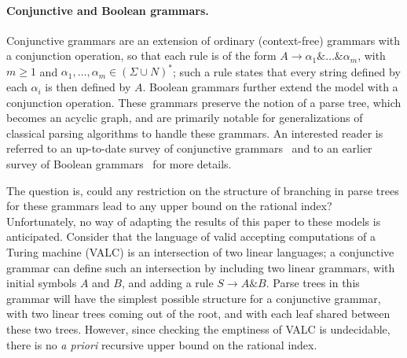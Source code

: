 \documentclass[runningheads]{llncs}
\begin{document}
\paragraph{Conjunctive and Boolean grammars.}
Conjunctive grammars are an extension of ordinary (context-free) grammars
with a conjunction operation,
so that each rule is of the form $A \to \alpha_1 \& \ldots \& \alpha_m$,
with $m \geqslant 1$ and $\alpha_1, \ldots, \alpha_m \in (\Sigma \cup N)^*$;
such a rule states that every string defined by each $\alpha_i$
is then defined by $A$.
Boolean grammars further extend the model with a conjunction operation.
These grammars preserve the notion of a parse tree,
which becomes an acyclic graph,
and are primarily notable for generalizations of classical parsing algorithms to handle these grammars.
An interested reader is referred to an up-to-date survey of conjunctive grammars~\cite{ConjunctiveTokyo}
and to an earlier survey of Boolean grammars~\cite{BooleanSurvey} for more details.

The question is, could any restriction on the structure of branching in parse trees for these grammars
lead to any upper bound on the rational index?
Unfortunately, no way of adapting the results of this paper to these models is anticipated.
Consider that the language of valid accepting computations of a Turing machine (VALC)
is an intersection of two linear languages;
a conjunctive grammar can define such an intersection
by including two linear grammars, with initial symbols $A$ and $B$,
and adding a rule $S \to A \& B$.
Parse trees in this grammar will have
the simplest possible structure for a conjunctive grammar,
with two linear trees coming out of the root,
and with each leaf shared between these two trees.
However, since checking the emptiness of VALC is undecidable,
there is no \emph{a priori} recursive upper bound on the rational index.

\end{document}
